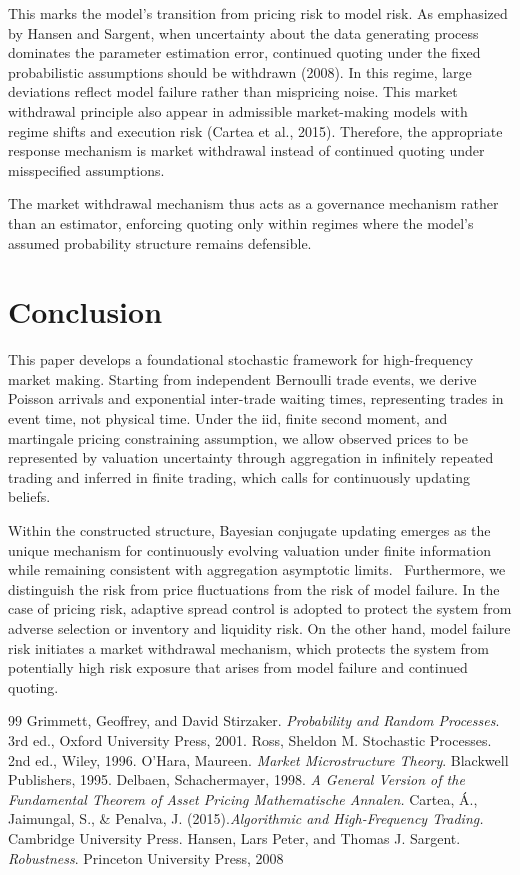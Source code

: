 \documentclass[12pt]{article}
\theoremstyle{plain}
\theoremstyle{definition}
\numberwithin{equation}{section}
\begin{document}
This marks the model's transition from pricing risk to model risk. As emphasized by Hansen and Sargent, when uncertainty about the data generating process dominates the parameter estimation error, continued quoting under the fixed probabilistic assumptions should be withdrawn (2008). In this regime, large deviations reflect model failure rather than mispricing noise. This market withdrawal principle also appear in admissible market-making models with regime shifts and execution risk (Cartea et al., 2015). Therefore, the appropriate response mechanism is market withdrawal  instead of continued quoting under misspecified assumptions.

The market withdrawal mechanism thus acts as a governance mechanism rather than an estimator, enforcing quoting only within regimes where the model's assumed probability structure remains defensible.
\section{Conclusion}
This paper develops a foundational stochastic framework for high-frequency market making. Starting from independent Bernoulli trade events, we derive Poisson arrivals and exponential inter-trade waiting times, representing trades in event time, not physical time. Under the iid, finite second moment, and martingale pricing constraining assumption, we allow observed prices to be represented by valuation uncertainty through aggregation in infinitely repeated trading and inferred in finite trading, which calls for continuously updating beliefs.

Within the constructed structure, Bayesian conjugate updating emerges as the unique mechanism for continuously evolving valuation under finite information while remaining consistent with aggregation asymptotic limits.  Furthermore, we distinguish the risk from price fluctuations from the risk of model failure. In the case of pricing risk, adaptive spread control is adopted to protect the system from adverse selection or inventory and liquidity risk. On the other hand, model failure risk initiates a market withdrawal mechanism, which protects the system from potentially high risk exposure that arises from model failure and continued quoting.

\newpage
\begin{thebibliography}{99}
Grimmett, Geoffrey, and David Stirzaker. \textit{Probability and Random Processes}. 3rd ed., Oxford University Press, 2001.
Ross, Sheldon M. Stochastic Processes. 2nd ed., Wiley, 1996.
O’Hara, Maureen. \textit{Market Microstructure Theory}. Blackwell Publishers, 1995.
Delbaen, Schachermayer, 1998. \textit{A General Version of the Fundamental Theorem of Asset Pricing Mathematische Annalen.}
Cartea, Á., Jaimungal, S., \& Penalva, J. (2015).\textit{Algorithmic and High-Frequency Trading.} Cambridge University Press.
Hansen, Lars Peter, and Thomas J. Sargent. \textit{Robustness}. Princeton University Press, 2008
\end{thebibliography}
\end{document}
